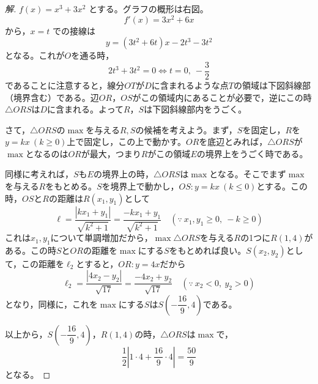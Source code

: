 \documentclass[../main.tex]{subfiles}
\begin{document}
\begin{proof}[解]
  $f(x)=x^3+3x^2$ とする。グラフの概形は右図。
  \[
    f'(x)=3x^2+6x
  \]
  から，$x=t$ での接線は
  \[
    y=(3t^2+6t)x-2t^3-3t^2
  \]
  となる。これが$O$を通る時，
  \[
    2t^3+3t^2=0 \iff t=0,\ -\frac32
  \]
  であることに注意すると，線分$OT$が$D$に含まれるような点$T$の領域は下図斜線部（境界含む）である。辺$OR$，$OS$がこの領域内にあることが必要で，逆にこの時$\triangle ORS$は$D$に含まれる。よって$R$，$S$は下図斜線部内をうごく。

  \begin{center}
  \end{center}

  さて，$\triangle ORS$の$\max$を与える$R,S$の候補を考えよう。まず，$S$を固定し，$R$を$y=kx\ (k\ge0)$上で固定し，この上で動かす。$OR$を底辺とみれば，$\triangle ORS$が$\max$となるのは$OR$が最大，つまり$R$がこの領域$E$の境界上をうごく時である。

  同様に考えれば，$S$も$E$の境界上の時，$\triangle ORS$は$\max$となる。そこでまず$\max$を与える$R$をもとめる。$S$を境界上で動かし，$OS: y=kx\ (k\le0)$とする。この時，$OS$と$R$の距離は$R(x_1,y_1)$として
  \[
    \ell=\frac{|kx_1+y_1|}{\sqrt{k^2+1}}=\frac{-kx_1+y_1}{\sqrt{k^2+1}} \quad (\because\ x_1,y_1\ge0,\ -k\ge0)
  \]
  これは$x_1,y_1$について単調増加だから，$\max\triangle ORS$を与える$R$の1つに$R(1,4)$がある。この時$S$と$OR$の距離を$\max$にする$S$をもとめれば良い。$S(x_2,y_2)$として，この距離を$\ell_2$とすると，$OR: y=4x$だから
  \[
    \ell_2=\frac{|4x_2-y_2|}{\sqrt{17}}=\frac{-4x_2+y_2}{\sqrt{17}} \quad (\because\ x_2<0,\ y_2>0)
  \]
  となり，同様に，これを$\max$にする$S$は$S\left(-\dfrac{16}{9},4\right)$である。

  以上から，$S\left(-\dfrac{16}{9},4\right)$，$R(1,4)$の時，$\triangle ORS$は$\max$で，
  \[
    \frac12\left|1\cdot4+\frac{16}{9}\cdot4\right|=\frac{50}{9}
  \]
  となる。
\end{proof}
\end{document}
